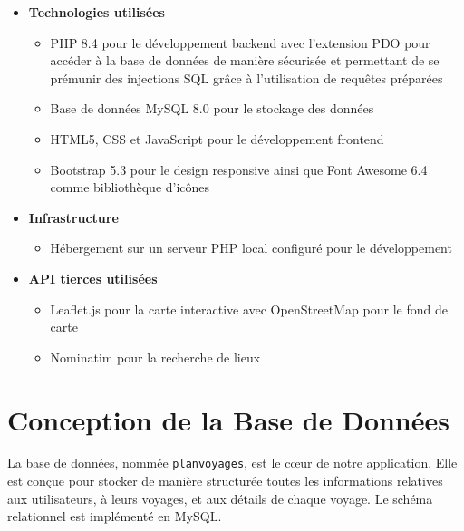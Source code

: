 \documentclass[a4paper,12pt]{article}
\begin{document}
\begin{itemize}
  \item \textbf{Technologies utilisées}
  \begin{itemize}
    \item PHP 8.4 pour le développement backend avec l'extension PDO pour accéder à la base de données de manière sécurisée et permettant de se prémunir des injections SQL grâce à l'utilisation de requêtes préparées
    \item Base de données MySQL 8.0 pour le stockage des données
    \item HTML5, CSS et JavaScript pour le développement frontend
    \item Bootstrap 5.3 pour le design responsive ainsi que Font Awesome 6.4 comme bibliothèque d'icônes
  \end{itemize}

  \item \textbf{Infrastructure}
  \begin{itemize}
    \item Hébergement sur un serveur PHP local configuré pour le développement
  \end{itemize}

  \item \textbf{API tierces utilisées}
  \begin{itemize}
    \item Leaflet.js pour la carte interactive avec OpenStreetMap pour le fond de carte
    \item Nominatim pour la recherche de lieux
  \end{itemize}
\end{itemize}

\section{Conception de la Base de Données}
La base de données, nommée \texttt{planvoyages}, est le cœur de notre application. Elle est conçue pour stocker de manière structurée toutes les informations relatives aux utilisateurs, à leurs voyages, et aux détails de chaque voyage. Le schéma relationnel est implémenté en MySQL.
\end{document}
